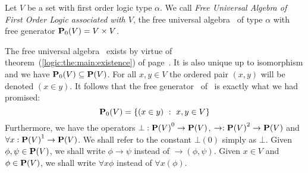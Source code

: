 \begin{defin}\label{logic:def:FOPL:free:algebra}
Let $V$ be a set with first order logic type $\alpha$. We call {\em
Free Universal Algebra of First Order Logic associated with $V$},
the free universal algebra \pv\ of type $\alpha$ with free generator
$\mbox{${\bf P}_{0}(V)$}=V\times V$.
\end{defin}

The free universal algebra \pv\ exists by virtue of
theorem~(\ref{logic:the:main:existence}) of
page~\pageref{logic:the:main:existence}. It is also unique up to
isomorphism and we have $\mbox{${\bf P}_{0}(V)$}\subseteq\mbox{${\bf P}(V)$}$. For all $x,y\in V$ the
ordered pair $(x,y)$ will be denoted $(x\in y)$. It follows that the
free generator \pvo\ of \pv\ is exactly what we had promised:
    \[
    \mbox{${\bf P}_{0}(V)$}=\{(x\in y)\ :\ x,y\in V\}
    \]
Furthermore, we have the operators $\bot:\mbox{${\bf P}(V)$}^{0}\to\mbox{${\bf P}(V)$}$,
$\to:\mbox{${\bf P}(V)$}^{2}\to\mbox{${\bf P}(V)$}$ and $\forall x:\mbox{${\bf P}(V)$}^{1}\to \mbox{${\bf P}(V)$}$. We shall refer
to the constant $\bot(0)$ simply as $\bot$. Given $\phi,\psi\in\mbox{${\bf P}(V)$}$,
we shall write $\phi\to\psi$ instead of $\to(\phi,\psi)$. Given
$x\in V$ and $\phi\in\mbox{${\bf P}(V)$}$, we shall write $\forall x\phi$ instead of
$\forall x(\phi)$.
